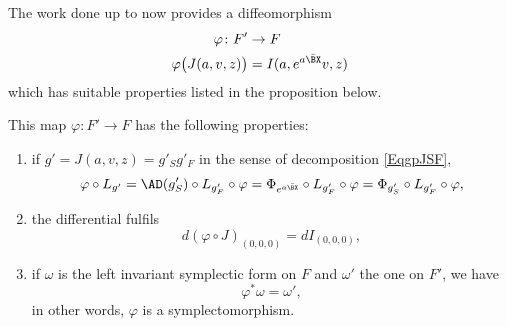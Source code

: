 The work done up to now provides a diffeomorphism
\begin{equation}
\begin{aligned}
 \varphi\colon F'&\to F \\ 
\varphi\big( J(a,v,z) \big)&=I(a, e^{a\bar{\BX }}v,z)
\end{aligned}
\end{equation}
which has suitable properties listed in the proposition below.

\begin{proposition}
This map $\varphi\colon F'\to F$ has the following properties:
\begin{enumerate}
\item if $g'=J(a,v,z)=g'_{S}g'_{F}$ in the sense of decomposition \eqref{EqgpJSF},
\begin{equation}
\varphi\circ L_{g'}=\AD(g'_{S})\circ L_{g'_{F}}\circ\varphi=\Phi_{ e^{a\bar{\BX }}}\circ L_{g'_{F}}\circ\varphi=\Phi_{g'_{S}}\circ L_{g'_{F}}\circ\varphi,
\end{equation}
\item the differential fulfils
\begin{equation}
d(\varphi\circ J)_{(0,0,0)}=dI_{(0,0,0)},
\end{equation}
\item if $\omega$ is the left invariant symplectic form on $F$ and $\omega'$ the one on $F'$, we have
\[ 
  \varphi^*\omega=\omega',
\]
in other words, $\varphi$ is a symplectomorphism.

\end{enumerate}

\end{proposition}
